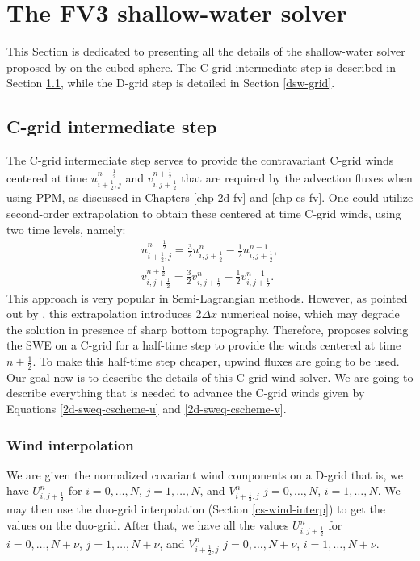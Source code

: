 \section{The FV3 shallow-water solver}
\label{sw:fv3solver}
This Section is dedicated to presenting all the details of the shallow-water solver proposed by \citet{lin:1997} on the cubed-sphere. 
The C-grid intermediate step is described in Section \ref{csw-grid}, while the D-grid step is detailed in Section \ref{dsw-grid}.

\subsection{C-grid intermediate step}
\label{csw-grid}
The C-grid intermediate step serves to provide the contravariant C-grid winds centered at time 
${u}^{n+\frac{1}{2}}_{i+\frac{1}{2},j}$ and ${v}^{n+\frac{1}{2}}_{i,j+\frac{1}{2}}$
that are required by the advection fluxes when using PPM, as discussed in Chapters \ref{chp-2d-fv} and \ref{chp-cs-fv}. 
One could utilize second-order extrapolation to obtain these centered at time C-grid winds, using two time levels, namely:
\begin{align}
{u}^{n+\frac{1}{2}}_{i+\frac{1}{2},j} = \frac{3}{2} {u}^{n}_{i,j+\frac{1}{2}} - \frac{1}{2} {u}^{n-1}_{i,j+\frac{1}{2}}, \\
{v}^{n+\frac{1}{2}}_{i,j+\frac{1}{2}} = \frac{3}{2} {v}^{n}_{i,j+\frac{1}{2}} - \frac{1}{2} {v}^{n-1}_{i,j+\frac{1}{2}}.
\end{align}
This approach is very popular in Semi-Lagrangian methods.
However, as pointed out by \citet{lin:1997}, this extrapolation introduces 2$\Delta x$ numerical noise, which may degrade the solution in presence
of sharp bottom topography. 
Therefore, \citet{lin:1997} proposes solving the SWE on a C-grid for a half-time step to provide the winds centered at time $n+\frac{1}{2}$. 
To make this half-time step cheaper, upwind fluxes are going to be used.
Our goal now is to describe the details of this C-grid wind solver.
We are going to describe everything that is needed to advance the 
C-grid winds given by Equations \eqref{2d-sweq-cscheme-u} and \eqref{2d-sweq-cscheme-v}.

\subsubsection{Wind interpolation}
We are given  the normalized covariant wind components  on a D-grid
that is, we have $U_{i,j+\frac{1}{2}}^n$ for $i=0,\ldots,N$, $j=1,\ldots,N$, 
and $V_{i+\frac{1}{2},j}^n$ $j=0,\ldots,N$, $i=1,\ldots,N$.
We may then use the duo-grid interpolation (Section \ref{cs-wind-interp}) to get the values on the duo-grid.
After that, we have all the values 
$U_{i,j+\frac{1}{2}}^n$ for $i=0,\ldots,N+\nu$, $j=1,\ldots,N+\nu$, 
and $V_{i+\frac{1}{2},j}^n$ $j=0,\ldots,N+\nu$, $i=1,\ldots,N+\nu$.


